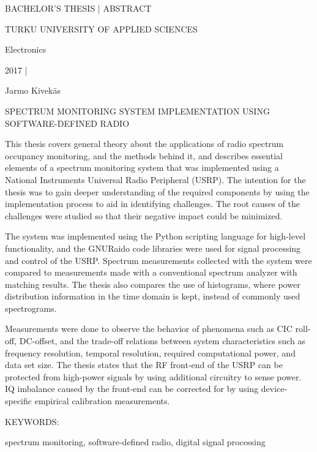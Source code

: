 BACHELOR'S THESIS | ABSTRACT

TURKU UNIVERSITY OF APPLIED SCIENCES

Electronics

2017 | \pageref{LastPage}


\vspace{7mm}
{\Large Jarmo Kivekäs \par}

\vspace{7mm}
{\huge SPECTRUM MONITORING SYSTEM IMPLEMENTATION USING SOFTWARE-DEFINED RADIO \par}

\vspace{7mm}




This thesis covers general theory about the applications of radio spectrum occupancy
monitoring, and the methods behind it, and describes essential elements of a
spectrum monitoring system that was implemented using a National Instruments Universal Radio Peripheral (USRP).
The intention for the thesis was to gain deeper understanding of the required components
by using the implementation process to aid in identifying challenges.
The root causes of the challenges were studied so that their negative impact could be minimized.

The system was implemented using the Python scripting language for high-level functionality, and the GNURaido
code libraries were used for signal processing and control of the USRP.
Spectrum measurements collected with the system were compared to measurements made with a conventional spectrum analyzer with matching results.
The thesis also compares the use of histograms, where power distribution information in the time domain is kept, instead of commonly used spectrograms.


Measurements were done to observe the behavior of phenomena such as CIC roll-off,
DC-offset, and the trade-off relations between system characteristics such as
frequency resolution, temporal resolution, required computational power,
and data set size.
The thesis states that the RF front-end of the USRP can be protected from high-power signals by using additional circuitry to sense power. IQ imbalance caused by the front-end can be corrected for by using device-specific
empirical calibration measurements.


\vspace{15mm}

KEYWORDS:

spectrum monitoring, software-defined radio, digital signal processing

